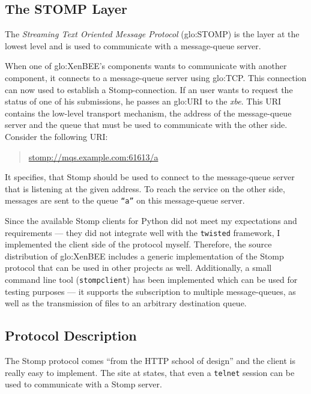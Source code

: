 \subsection{The STOMP Layer}
\label{sec:protocol:stomp}

The  \emph{Streaming  Text  Oriented Message  Protocol}  (\gls{glo:STOMP})
\cite{stomp} is the  layer at the lowest level and  is used to communicate
with  a  message-queue  server.

When  one  of  \gls{glo:XenBEE}'s  components wants  to  communicate  with
another   component,  it   connects  to   a  message-queue   server  using
\gls{glo:TCP}.    This   connection   can   now  used   to   establish   a
Stomp-connection. If  an user wants  to request the  status of one  of his
submissions,  he  passes an  \gls{glo:URI}  to  the  \emph{xbe}. This  URI
contains   the  low-level   transport  mechanism,   the  address   of  the
message-queue server and  the queue that must be  used to communicate with
the other side.  Consider the following URI:
\begin{quote}
  \url{stomp://mqs.example.com:61613/a}
\end{quote}
It specifies,  that Stomp should be  used to connect  to the message-queue
server that is listening at the given address. To reach the service on the
other  side,  messages  are  sent  to the  queue  \texttt{``a''}  on  this
message-queue server.

Since the available Stomp clients  for Python did not meet my expectations
and requirements --- they did not integrate well with the \texttt{twisted}
framework,  I  implemented  the   client  side  of  the  protocol  myself.
Therefore, the source distribution  of \gls{glo:XenBEE} includes a generic
implementation of the Stomp protocol that can be used in other projects as
well.  Additionally, a small  command line tool (\texttt{stompclient}) has
been implemented  which can be used  for testing purposes  --- it supports
the subscription  to multiple message-queues, as well  as the transmission
of files to an arbitrary destination queue.

\subsection*{Protocol Description}

The Stomp protocol comes ``from the HTTP school of design'' and the client
is really easy to implement. The  site at \cite{stomp} states, that even a
\texttt{telnet} session can be used to communicate with a Stomp server.

